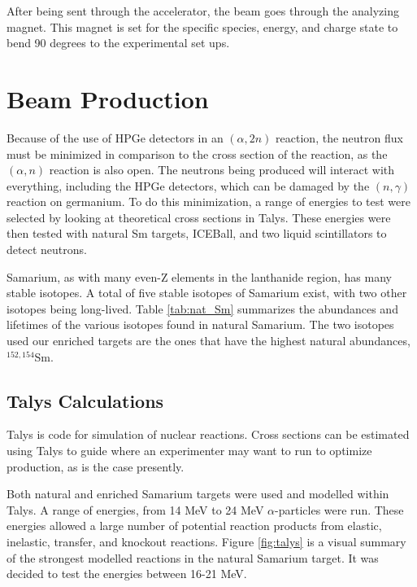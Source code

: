 

After being sent through the accelerator, the beam goes through the analyzing magnet. This magnet is set for the specific species, energy, and charge state to bend 90 degrees to the experimental set ups.

\section{Beam Production}

Because of the use of HPGe detectors in an $(\alpha,2n)$ reaction, the neutron flux must be minimized in comparison to the cross section of the reaction, as the $(\alpha,n)$ reaction is also open. The neutrons being produced will interact with everything, including the HPGe detectors, which can be damaged by the $(n,\gamma)$ reaction on germanium. To do this minimization, a range of energies to test were selected by looking at theoretical cross sections in Talys\citep{koning07:_talys}. These energies were then tested with natural Sm targets, ICEBall, and two liquid scintillators to detect neutrons.

Samarium, as with many even-Z elements in the lanthanide region, has many stable isotopes. A total of five stable isotopes of Samarium exist, with two other isotopes being long-lived. Table \ref{tab:nat_Sm} summarizes the abundances and lifetimes of the various isotopes found in natural Samarium. The two isotopes used our enriched targets are the ones that have the highest natural abundances, $^{152,154}$Sm.



\subsection{Talys Calculations}

Talys \citep{koning07:_talys} is code for simulation of nuclear reactions. Cross sections can be estimated using Talys to guide where an experimenter may want to run to optimize production, as is the case presently. 

Both natural and enriched Samarium targets were used and modelled within Talys. A range of energies, from 14 MeV to 24 MeV $\alpha$-particles were run. These energies allowed a large number of potential reaction products from elastic, inelastic, transfer, and knockout reactions. Figure \ref{fig:talys} is a visual summary of the strongest modelled reactions in the natural Samarium target. It was decided to test the energies between 16-21 MeV.


